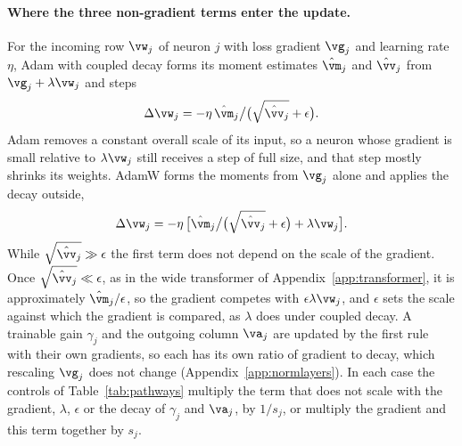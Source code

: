 \documentclass{article} %
\begin{document}
\paragraph{Where the three non-gradient terms enter the update.} For the incoming row $\vw_j$ of neuron $j$ with loss gradient $\vg_j$ and learning rate $\eta$, Adam with coupled decay forms its moment estimates $\hat{\vm}_j$ and $\hat{\vv}_j$ from $\vg_j + \lambda \vw_j$ and steps
\begin{equation}
\Delta \vw_j = -\eta\, \hat{\vm}_j \big/ \big(\sqrt{\hat{\vv}_j} + \epsilon\big).
\end{equation}
Adam removes a constant overall scale of its input, so a neuron whose gradient is small relative to $\lambda \vw_j$ still receives a step of full size, and that step mostly shrinks its weights. AdamW forms the moments from $\vg_j$ alone and applies the decay outside,
\begin{equation}
\Delta \vw_j = -\eta\, \big[\hat{\vm}_j \big/ \big(\sqrt{\hat{\vv}_j} + \epsilon\big) + \lambda \vw_j\big].
\end{equation}
While $\sqrt{\hat{\vv}_j} \gg \epsilon$ the first term does not depend on the scale of the gradient. Once $\sqrt{\hat{\vv}_j} \ll \epsilon$, as in the wide transformer of Appendix~\ref{app:transformer}, it is approximately $\hat{\vm}_j / \epsilon$, so the gradient competes with $\epsilon \lambda \vw_j$, and $\epsilon$ sets the scale against which the gradient is compared, as $\lambda$ does under coupled decay. A trainable gain $\gamma_j$ and the outgoing column $\va_j$ are updated by the first rule with their own gradients, so each has its own ratio of gradient to decay, which rescaling $\vg_j$ does not change (Appendix~\ref{app:normlayers}). In each case the controls of Table~\ref{tab:pathways} multiply the term that does not scale with the gradient, $\lambda$, $\epsilon$ or the decay of $\gamma_j$ and $\va_j$, by $1/s_j$, or multiply the gradient and this term together by $s_j$.
\end{document}
